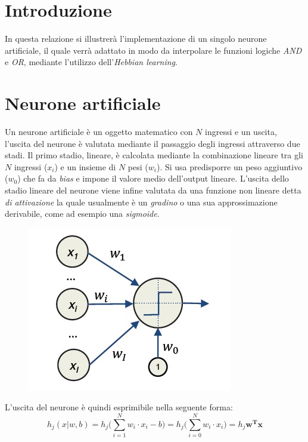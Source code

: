 \documentclass[12pt]{article}
\begin{document}
\maketitle
\newpage

\section{Introduzione}
In questa relazione si illustrerà l'implementazione di un singolo neurone artificiale, il quale verrà adattato in modo da interpolare le funzioni logiche \emph{AND} e \emph{OR}, mediante l'utilizzo dell'\emph{Hebbian learning}.

\section {Neurone artificiale}
Un neurone artificiale è un oggetto matematico con $N$ ingressi e un uscita, l'uscita del neurone è valutata mediante il passaggio degli ingressi attraverso due stadi. Il primo stadio, lineare, è calcolata mediante la combinazione lineare tra gli $N$ ingressi ($x_i$) e un insieme di $N$ pesi ($w_i$). Si usa predisporre un peso aggiuntivo ($w_0$) che fa da \emph{bias} e impone il valore medio dell'output lineare. L'uscita dello stadio lineare del neurone viene infine valutata da una funzione non lineare detta \emph{di attivazione} la quale usualmente è un \emph{gradino} o una sua approssimazione derivabile, come ad esempio una \emph{sigmoide}.

\begin{figure}[h]
\includegraphics{Neuron.jpg}
\centering
\end{figure}

L'uscita del neurone è quindi esprimibile nella seguente forma:
$$ h_j (x | w,b) = h_j \bigg( \sum_{i=1}^{N} w_i \cdot x_i - b \bigg) = h_j \bigg( \sum_{i=0}^{N} w_i \cdot x_i \bigg) = h_j \mathbf{w^T x} $$
\end{document}
